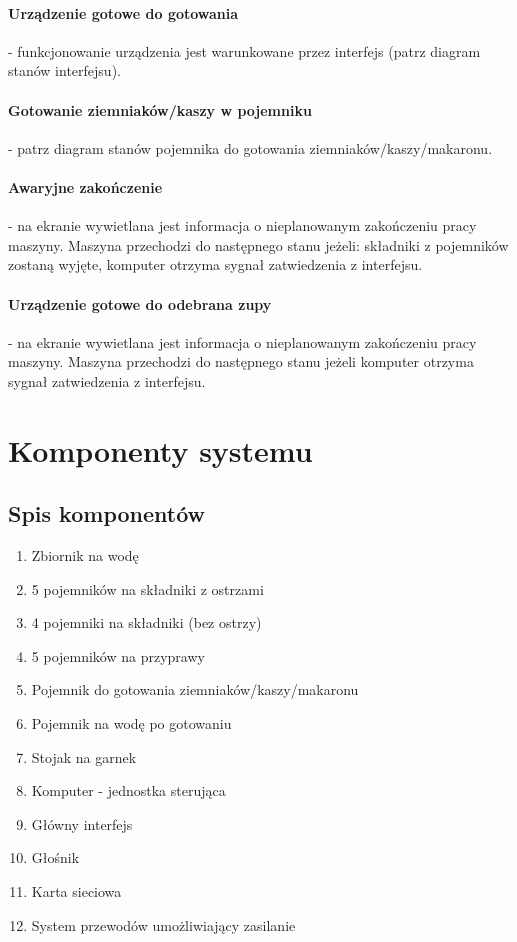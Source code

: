 \documentclass[12pt,a4paper,notitlepage]{article}
\begin{document}
\paragraph{Urządzenie gotowe do gotowania} - funkcjonowanie urządzenia jest warunkowane przez interfejs (patrz diagram stanów interfejsu).
\paragraph{Gotowanie ziemniaków/kaszy w pojemniku} - patrz diagram stanów pojemnika do gotowania ziemniaków/kaszy/makaronu.
\paragraph{Awaryjne zakończenie} - na ekranie wywietlana jest informacja o nieplanowanym zakończeniu pracy maszyny. Maszyna przechodzi do następnego stanu jeżeli: składniki z pojemników zostaną wyjęte, komputer otrzyma sygnał zatwiedzenia z interfejsu.
\paragraph{Urządzenie gotowe do odebrana zupy} - na ekranie wywietlana jest informacja o nieplanowanym zakończeniu pracy maszyny. Maszyna przechodzi do następnego stanu jeżeli komputer otrzyma sygnał zatwiedzenia z interfejsu.


\newpage
\section{Komponenty systemu}

\subsection{Spis komponentów}
\begin{enumerate}
  \item Zbiornik na wodę
  \item 5 pojemników na składniki z ostrzami
  \item 4 pojemniki na składniki (bez ostrzy)
  \item 5 pojemników na przyprawy
  \item Pojemnik do gotowania ziemniaków/kaszy/makaronu
  \item Pojemnik na wodę po gotowaniu
  \item Stojak na garnek
  \item Komputer - jednostka sterująca
  \item Główny interfejs
  \item Głośnik
  \item Karta sieciowa
  \item System przewodów umożliwiający zasilanie
\end{enumerate}
\end{document}
